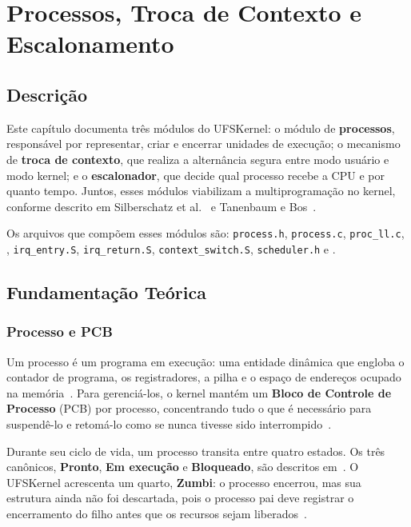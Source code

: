 \chapter{Processos, Troca de Contexto e Escalonamento}




\section{Descrição}


Este capítulo documenta três módulos do UFSKernel:
o módulo de \textbf{processos}, responsável por representar, criar e encerrar
unidades de execução; o mecanismo de \textbf{troca de contexto}, que realiza
a alternância segura entre modo usuário e modo kernel; e o \textbf{escalonador},
que decide qual processo recebe a CPU e por quanto tempo. Juntos, esses módulos
viabilizam a multiprogramação no kernel, conforme descrito em
Silberschatz et al.~\cite{silberschatz2018} e Tanenbaum e Bos~\cite{tanenbaum2015}.

Os arquivos que compõem esses módulos são: \texttt{process.h},
\texttt{process.c}, \texttt{proc\_ll.c}, , \texttt{irq\_entry.S}, \texttt{irq\_return.S}, \texttt{context\_switch.S}, \texttt{scheduler.h} e .


\section{Fundamentação Teórica}


\subsection{Processo e PCB}

Um processo é um programa em execução: uma entidade dinâmica que engloba
o contador de programa, os registradores, a pilha e o espaço de endereços
ocupado na memória~\cite{tanenbaum2015}. Para gerenciá-los, o kernel mantém
um \textbf{Bloco de Controle de Processo} (PCB) por processo, concentrando
tudo o que é necessário para suspendê-lo e retomá-lo como se nunca tivesse
sido interrompido~\cite{silberschatz2018}.

Durante seu ciclo de vida, um processo transita entre quatro estados. Os três
canônicos, \textbf{Pronto}, \textbf{Em execução} e \textbf{Bloqueado}, são
descritos em~\cite{tanenbaum2015}. O UFSKernel acrescenta um quarto,
\textbf{Zumbi}: o processo encerrou, mas sua estrutura ainda não foi
descartada, pois o processo pai deve registrar o encerramento do filho antes
que os recursos sejam liberados~\cite{silberschatz2018}.

